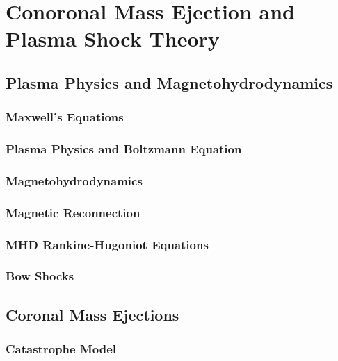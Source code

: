 

\chapter{Conoronal Mass Ejection and Plasma Shock Theory} 
\label{chap:2}


\section{Plasma Physics and Magnetohydrodynamics}\label{sec:1}

\subsection{Maxwell's Equations}\label{sec:10}

\subsection{Plasma Physics and Boltzmann Equation}\label{sec:11}

\subsection{Magnetohydrodynamics}\label{sec:12}

\subsection{Magnetic Reconnection}\label{sec:13}

\subsection{MHD Rankine-Hugoniot Equations}\label{sec:14}

\subsection{Bow Shocks}\label{sec:15}



\section{Coronal Mass Ejections}\label{sec:2}

\subsection{Catastrophe Model}\label{sec:20}

